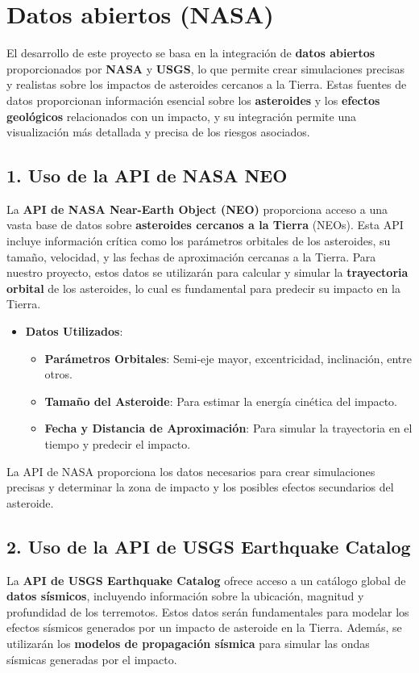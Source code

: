 \documentclass[conference]{IEEEtran}
\begin{document}
\section{Datos abiertos (NASA)}
El desarrollo de este proyecto se basa en la integración de
\textbf{datos abiertos} proporcionados por \textbf{NASA} y \textbf{USGS}, lo
que permite crear simulaciones precisas y realistas sobre los impactos de
asteroides cercanos a la Tierra. Estas fuentes de datos proporcionan
información esencial sobre los \textbf{asteroides} y los
\textbf{efectos geológicos} relacionados con un impacto, y su integración
permite una visualización más detallada y precisa de los riesgos asociados.

\subsection{1. Uso de la \textbf{API de NASA NEO}}
La \textbf{API de NASA Near-Earth Object (NEO)} proporciona acceso a una
vasta base de datos sobre \textbf{asteroides cercanos a la Tierra} (NEOs).
Esta API incluye información crítica como los parámetros orbitales de los
asteroides, su tamaño, velocidad, y las fechas de aproximación cercanas a la
Tierra. Para nuestro proyecto, estos datos se utilizarán para calcular y
simular la \textbf{trayectoria orbital} de los asteroides, lo cual es
fundamental para predecir su impacto en la Tierra.

\begin{itemize}
	\item \textbf{Datos Utilizados}:
	      \begin{itemize}
		      \item \textbf{Parámetros Orbitales}: Semi-eje mayor, excentricidad,
		            inclinación, entre otros.
		      \item \textbf{Tamaño del Asteroide}: Para estimar la energía cinética
		            del impacto.
		      \item \textbf{Fecha y Distancia de Aproximación}: Para simular la
		            trayectoria en el tiempo y predecir el impacto.
	      \end{itemize}
\end{itemize}

La API de NASA proporciona los datos necesarios para crear simulaciones
precisas y determinar la zona de impacto y los posibles efectos secundarios del asteroide.

\subsection{2. Uso de la API de USGS Earthquake Catalog}
La \textbf{API de USGS Earthquake Catalog} ofrece acceso a un catálogo
global de \textbf{datos sísmicos}, incluyendo información sobre la ubicación, magnitud y profundidad de los terremotos. Estos datos serán fundamentales para modelar los efectos sísmicos generados por un impacto de asteroide en la Tierra. Además, se utilizarán los \textbf{modelos de propagación sísmica} para simular las ondas sísmicas generadas por el impacto.
\end{document}
